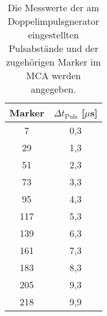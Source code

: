     \begin{table}[h]
        \centering
        \caption{Die Messwerte der am Doppelimpulsgnerator eingestellten Pulsabstände und der zugehörigen Marker im MCA werden angegeben.}
        \label{tab:Marker_Faktor}
        \begin{tabular}{c c}
        \toprule
        {Marker} & {$\Delta t_{\text{Puls}}$ [$\mu$s]} \\
        \midrule
        7   & 0,3 \\
        29  & 1,3 \\
        51  & 2,3 \\
        73  & 3,3 \\
        95  & 4,3 \\
        117 & 5,3 \\
        139 & 6,3 \\
        161 & 7,3 \\
        183 & 8,3 \\
        205 & 9,3 \\
        218 & 9,9 \\
        \bottomrule
        \end{tabular}
    \end{table}

    \FloatBarrier
